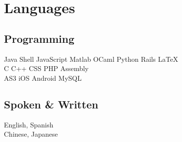 \documentclass[]{deedy-resume-openfont}
\begin{document}
\section{Languages}
\begin{minipage}[t]{.6\textwidth}
\subsection{Programming}
Java \textbullet{}   Shell \textbullet{} JavaScript \textbullet{} Matlab \textbullet{}
OCaml \textbullet{} Python \textbullet{} Rails \textbullet{} \LaTeX\ \\ 
C \textbullet{} C++ \textbullet{} CSS \textbullet{} PHP \textbullet{} Assembly \\
AS3 \textbullet{} iOS \textbullet{} Android \textbullet{} MySQL
\sectionsep
\end{minipage}
\hfill
\begin{minipage}[t]{.35\textwidth}
\subsection{Spoken \& Written}
 English, Spanish\\
 Chinese, Japanese\\
\end{minipage}
\end{document}
